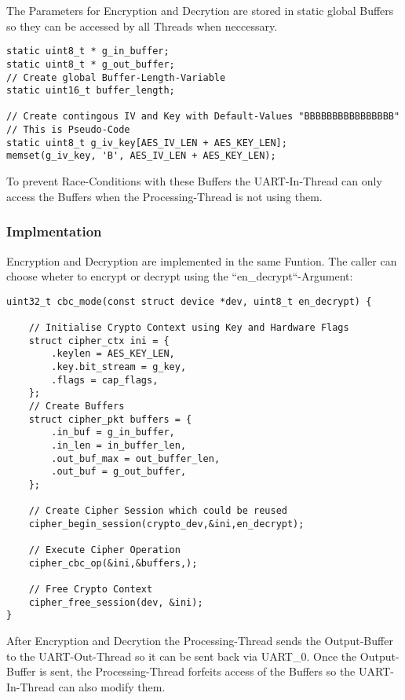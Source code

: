The Parameters for Encryption and Decrytion are stored in static global
Buffers so they can be accessed by all Threads when neccessary.

\begin{lstlisting}[style=CStyle,caption=Global Buffers for Encryption and Decryption]
static uint8_t * g_in_buffer;
static uint8_t * g_out_buffer;
// Create global Buffer-Length-Variable
static uint16_t buffer_length;

// Create contingous IV and Key with Default-Values "BBBBBBBBBBBBBBBB"
// This is Pseudo-Code
static uint8_t g_iv_key[AES_IV_LEN + AES_KEY_LEN];
memset(g_iv_key, 'B', AES_IV_LEN + AES_KEY_LEN);
\end{lstlisting}

To prevent Race-Conditions with these Buffers the UART-In-Thread can only
access the Buffers when the Processing-Thread is not using them.

\pagebreak

\subsubsection{Implmentation}

Encryption and Decryption are implemented in the same Funtion.
The caller can choose wheter to encrypt or decrypt using the
``en\_decrypt``-Argument:

\begin{lstlisting}[style=CStyle,caption=Encryption and Decryption Pseudo-Code]
uint32_t cbc_mode(const struct device *dev, uint8_t en_decrypt) {

	// Initialise Crypto Context using Key and Hardware Flags
	struct cipher_ctx ini = {
		.keylen = AES_KEY_LEN,
		.key.bit_stream = g_key,
		.flags = cap_flags,
	};
	// Create Buffers
	struct cipher_pkt buffers = {
		.in_buf = g_in_buffer,
		.in_len = in_buffer_len,
		.out_buf_max = out_buffer_len,
		.out_buf = g_out_buffer,
	};

	// Create Cipher Session which could be reused
	cipher_begin_session(crypto_dev,&ini,en_decrypt);

	// Execute Cipher Operation
	cipher_cbc_op(&ini,&buffers,);

	// Free Crypto Context
	cipher_free_session(dev, &ini);
}
\end{lstlisting}

After Encryption and Decrytion the Processing-Thread sends the Output-Buffer
to the UART-Out-Thread so it can be sent back via UART\_0.
Once the Output-Buffer is sent, the Processing-Thread forfeits access of
the Buffers so the UART-In-Thread can also modify them.

